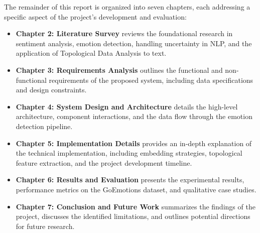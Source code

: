 The remainder of this report is organized into seven chapters, each addressing a specific aspect of the project's development and evaluation:

\begin{itemize}
    \item \textbf{Chapter 2: Literature Survey} reviews the foundational research in sentiment analysis, emotion detection, handling uncertainty in NLP, and the application of Topological Data Analysis to text.
    \item \textbf{Chapter 3: Requirements Analysis} outlines the functional and non-functional requirements of the proposed system, including data specifications and design constraints.
    \item \textbf{Chapter 4: System Design and Architecture} details the high-level architecture, component interactions, and the data flow through the emotion detection pipeline.
    \item \textbf{Chapter 5: Implementation Details} provides an in-depth explanation of the technical implementation, including embedding strategies, topological feature extraction, and the project development timeline.
    \item \textbf{Chapter 6: Results and Evaluation} presents the experimental results, performance metrics on the GoEmotions dataset, and qualitative case studies.
    \item \textbf{Chapter 7: Conclusion and Future Work} summarizes the findings of the project, discusses the identified limitations, and outlines potential directions for future research.
\end{itemize}
